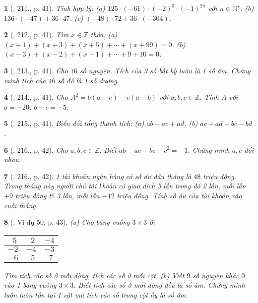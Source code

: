 \documentclass{article}
\newtheorem{baitoan}{}
\begin{document}
\begin{baitoan}[\cite{Tuyen_Toan_6}, 211., p. 41]
	Tính hợp lý: (a) $125\cdot(-61)\cdot(-2)^3\cdot(-1)^{2n}$ với $n\in\mathbb{N}^\star$. (b) $136\cdot(-47) + 36\cdot47$. (c) $(-48)\cdot72 + 36\cdot(-304)$.
\end{baitoan}

\begin{baitoan}[\cite{Tuyen_Toan_6}, 212., p. 41]
	Tìm $x\in\mathbb{Z}$ thỏa: (a) $(x + 1) + (x + 3) + (x + 5) + \cdots + (x + 99) = 0$. (b) $(x - 3) + (x - 2) + (x - 1) + \cdots + 9 + 10 = 0$.
\end{baitoan}

\begin{baitoan}[\cite{Tuyen_Toan_6}, 213., p. 41]
	Cho $16$ số nguyên. Tích của 3 số bất kỳ luôn là 1 số âm. Chứng minh tích của $16$ số đó là 1 số dương.
\end{baitoan}

\begin{baitoan}[\cite{Tuyen_Toan_6}, 214., p. 41]
	Cho $A^2 = b(a - c) - c(a - b)$ với $a,b,c\in\mathbb{Z}$. Tính $A$ với $a = -20$, $b - c = -5$.
\end{baitoan}

\begin{baitoan}[\cite{Tuyen_Toan_6}, 215., p. 41]
	Biến đổi tổng thành tích: (a) $ab - ac + ad$. (b) $ac + ad - bc - bd$.
\end{baitoan}

\begin{baitoan}[\cite{Tuyen_Toan_6}, 216., p. 42]
	Cho $a,b,c\in\mathbb{Z}$. Biết $ab - ac + bc - c^2 = -1$. Chứng minh $a,c$ đối nhau.
\end{baitoan}

\begin{baitoan}[\cite{Tuyen_Toan_6}, 216., p. 42]
	1 tài khoản ngân hàng có số dư đầu tháng là $48$ triệu đồng. Trong tháng này người chủ tài khoản có giao dịch 5 lần trong đó 2 lần, mỗi lần $+9$ triệu đồng \& 3 lần, mỗi lần $-12$ triệu đồng. Tính số dư của tài khoản vào cuối tháng.
\end{baitoan}

\begin{baitoan}[\cite{Binh_Toan_6_tap_1}, Ví dụ 50, p. 43]
	(a) Cho bảng vuông $3\times 3$ ô:
	\begin{table}[H]
		\centering
		\begin{tabular}{|c|c|c|}
			\hline
			$\ \ 5$ & $\ \ 2$ & $-4$ \\
			\hline
			$-2$ & $-4$ & $-3$ \\
			\hline
			$-6$ & $\ \ 5$ & $\ \ 7$ \\
			\hline
		\end{tabular}
	\end{table}
	\noindent Tìm tích các số ở mỗi dòng, tích các số ở mỗi cột. (b) Viết $9$ số nguyên khác $0$ vào 1 bảng vuông $3\times 3$. Biết tích các số ở mỗi dòng đều là số âm. Chứng minh luôn luôn tồn tại 1 cột mà tích các số trong cột ấy là số âm.
\end{baitoan}
\end{document}
